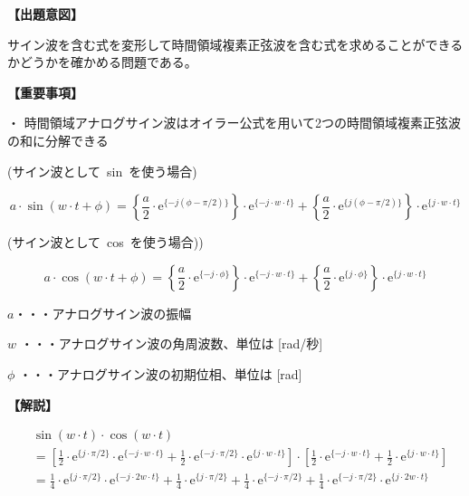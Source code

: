 \noindent \textbf{【出題意図】}

\bigskip
\noindent サイン波を含む式を変形して時間領域複素正弦波を含む式を求めることができるかどうかを確かめる問題である。

\vspace{1em}
\noindent \textbf{【重要事項】}

\medskip
\noindent ・ 時間領域アナログサイン波はオイラー公式を用いて2つの時間領域複素正弦波の和に分解できる

\medskip
\noindent \mbox{(サイン波として sin を使う場合)}

\[
a \cdot \sin ( w \cdot t + \phi )
=  \left \{ \frac{a}{2} \cdot \textrm{e}^{\{-j (\phi-\pi/2) \}} \right \} \cdot \textrm{e}^{\{-j \cdot w \cdot t \}}
+  \left \{ \frac{a}{2} \cdot \textrm{e}^{\{j (\phi-\pi/2) \}} \right \} \cdot \textrm{e}^{\{j \cdot w \cdot t \}}
\]

\medskip
\noindent \mbox{(サイン波として cos を使う場合))}

\[
a \cdot \cos ( w \cdot t + \phi )
=  \left \{ \frac{a}{2} \cdot \textrm{e}^{\{-j \cdot \phi \}} \right \} \cdot \textrm{e}^{\{-j \cdot w \cdot t \}}
+  \left \{ \frac{a}{2} \cdot \textrm{e}^{\{j  \cdot \phi \}} \right \} \cdot \textrm{e}^{\{j \cdot w \cdot t \}}
\]

\bigskip
\noindent  $a$・・・アナログサイン波の振幅

\bigskip
\noindent $w$ ・・・アナログサイン波の角周波数、単位は [rad/秒]

\bigskip
\noindent $\phi$ ・・・アナログサイン波の初期位相、単位は [rad]

\bigskip

\vspace{0.5em}
\noindent \textbf{【解説】}

\begin{align*}
& \sin (w \cdot t) \cdot \cos (w \cdot t) \\
&=
\left [
  \frac{1}{2} \cdot \textrm{e}^{\{ j \cdot \pi/2 \}} \cdot \textrm{e}^{\{-j \cdot w \cdot t \}} 
+ \frac{1}{2} \cdot \textrm{e}^{\{-j \cdot \pi/2 \}} \cdot \textrm{e}^{\{ j \cdot w \cdot t \}} 
\right ]
\cdot
\left [
  \frac{1}{2} \cdot \textrm{e}^{\{-j \cdot w \cdot t \}} 
+ \frac{1}{2} \cdot \textrm{e}^{\{ j \cdot w \cdot t \}} 
\right ]  \\
&=
 \frac{1}{4} \cdot \textrm{e}^{\{ j \cdot \pi/2 \}} \cdot \textrm{e}^{\{-j \cdot 2w \cdot t \}} 
+\frac{1}{4}\cdot\textrm{e}^{\{ j \cdot \pi/2 \}}
+\frac{1}{4}\cdot\textrm{e}^{\{-j \cdot \pi/2 \}}
+\frac{1}{4} \cdot \textrm{e}^{\{-j \cdot \pi/2 \}} \cdot \textrm{e}^{\{ j \cdot 2w \cdot t \}} 
\end{align*}
